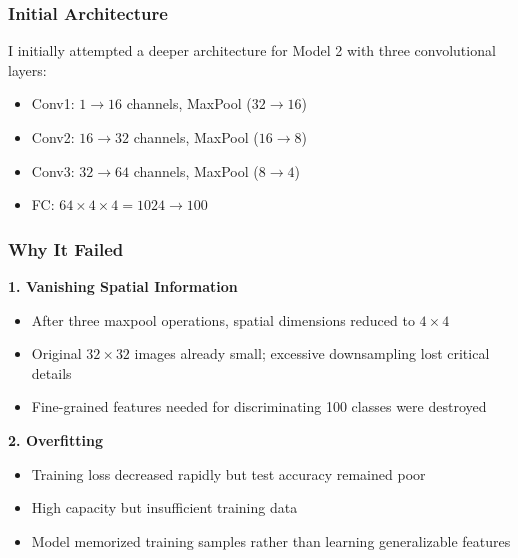 \documentclass[11pt,a4paper]{article}
\begin{document}
\subsubsection{Initial Architecture}
I initially attempted a deeper architecture for Model 2 with three convolutional layers:
\begin{itemize}
    \item Conv1: $1 \rightarrow 16$ channels, MaxPool ($32 \rightarrow 16$)
    \item Conv2: $16 \rightarrow 32$ channels, MaxPool ($16 \rightarrow 8$)
    \item Conv3: $32 \rightarrow 64$ channels, MaxPool ($8 \rightarrow 4$)
    \item FC: $64 \times 4 \times 4 = 1024 \rightarrow 100$
\end{itemize}

\subsubsection{Why It Failed}

\textbf{1. Vanishing Spatial Information}
\begin{itemize}
    \item After three maxpool operations, spatial dimensions reduced to $4 \times 4$
    \item Original $32 \times 32$ images already small; excessive downsampling lost critical details
    \item Fine-grained features needed for discriminating 100 classes were destroyed
\end{itemize}

\textbf{2. Overfitting}
\begin{itemize}
    \item Training loss decreased rapidly but test accuracy remained poor 
    \item High capacity but insufficient training data
    \item Model memorized training samples rather than learning generalizable features
\end{itemize}
\end{document}
